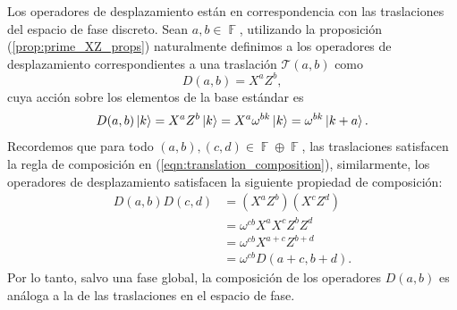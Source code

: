 \documentclass[a4paper,11pt]{report}
\DeclareMathOperator{\F}{\mathbb{F}}
\begin{document}
  Los operadores de desplazamiento están en correspondencia
  con las traslaciones del espacio de fase discreto. Sean
  $a,b \in \F$, utilizando la proposición
  (\ref{prop:prime_XZ_props}) naturalmente definimos a los
  operadores de desplazamiento correspondientes a una
  traslación $\mathcal T(a,b)$ como 
  \begin{equation}
    D(a,b)
    = X^{a} Z^{b},
  \end{equation}
  cuya acción sobre los elementos de la base estándar es
  \[
    D(a,b) \ket{k}
    = X^{a} Z^{b} \ket k
    = X^{a} \omega^{bk} \ket k
    = \omega^{bk} \ket{k+a}.
  \] 
  Recordemos que para todo $(a,b), (c,d) \in \F \oplus \F$,
  las traslaciones satisfacen la regla de composición en
  (\ref{eqn:translation_composition}), similarmente, los
  operadores de desplazamiento satisfacen la siguiente
  propiedad de composición:
  \begin{align}
    D(a,b) D(c,d)
    &= \left( X^{a}Z^{b} \right) \left( X^{c}Z^{d} \right)
    \\
    &= \omega^{c b} X^{a} X^{c} Z^{b} Z^{d} \\
    &= \omega^{c b} X^{a+c} Z^{b+d} \\
    &= \omega^{c b} D(a+c, b+d).
  \end{align}
  Por lo tanto, salvo una fase global, la composición de los
  operadores $D(a,b)$ es análoga a la de las traslaciones en
  el espacio de fase.
\end{document}
